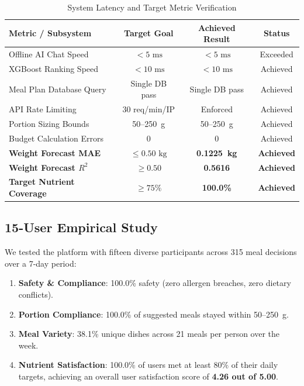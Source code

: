 \documentclass[10pt, conference, letterpaper]{IEEEtran}
\begin{document}
\begin{table}[htbp]
\centering
\caption{System Latency and Target Metric Verification}
\label{tab:system_metrics}
\footnotesize
\setlength{\tabcolsep}{4pt}
\begin{tabularx}{\columnwidth}{Y c c c}
\toprule
\textbf{Metric / Subsystem} & \textbf{Target Goal} & \textbf{Achieved Result} & \textbf{Status} \\
\midrule
Offline AI Chat Speed & $< 5\text{ ms}$ & $< 5\text{ ms}$ & Exceeded \\
XGBoost Ranking Speed & $< 10\text{ ms}$ & $< 10\text{ ms}$ & Achieved \\
Meal Plan Database Query & Single DB pass & Single DB pass & Achieved \\
API Rate Limiting & 30 req/min/IP & Enforced & Achieved \\
Portion Sizing Bounds & 50--250~g & 50--250~g & Achieved \\
Budget Calculation Errors & 0 & 0 & Achieved \\
\textbf{Weight Forecast MAE} & $\le 0.50\text{ kg}$ & \textbf{0.1225~kg} & \textbf{Achieved} \\
\textbf{Weight Forecast $R^2$} & $\ge 0.50$ & \textbf{0.5616} & \textbf{Achieved} \\
\textbf{Target Nutrient Coverage} & $\ge 75\%$ & \textbf{100.0\%} & \textbf{Achieved} \\
\bottomrule
\end{tabularx}
\end{table}

\subsection{15-User Empirical Study}
We tested the platform with fifteen diverse participants across 315 meal decisions over a 7-day period:
\begin{enumerate}[leftmargin=*, nosep]
    \item \textbf{Safety \& Compliance}: 100.0\% safety (zero allergen breaches, zero dietary conflicts).
    \item \textbf{Portion Compliance}: 100.0\% of suggested meals stayed within 50--250~g.
    \item \textbf{Meal Variety}: 38.1\% unique dishes across 21 meals per person over the week.
    \item \textbf{Nutrient Satisfaction}: 100.0\% of users met at least $80\%$ of their daily targets, achieving an overall user satisfaction score of \textbf{4.26 out of 5.00}.
\end{enumerate}
\end{document}
